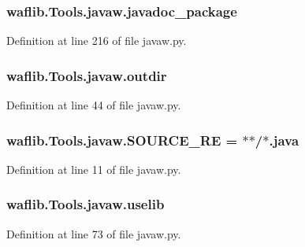 \subsubsection[{\texorpdfstring{javadoc\+\_\+package}{javadoc_package}}]{\setlength{\rightskip}{0pt plus 5cm}waflib.\+Tools.\+javaw.\+javadoc\+\_\+package}\hypertarget{namespacewaflib_1_1_tools_1_1javaw_a965e5565dd0a0d95f82c2b1ee2bcb520}{}\label{namespacewaflib_1_1_tools_1_1javaw_a965e5565dd0a0d95f82c2b1ee2bcb520}


Definition at line 216 of file javaw.\+py.

\subsubsection[{\texorpdfstring{outdir}{outdir}}]{\setlength{\rightskip}{0pt plus 5cm}waflib.\+Tools.\+javaw.\+outdir}\hypertarget{namespacewaflib_1_1_tools_1_1javaw_acdcd1f54bb01a7e871c5e849005c5736}{}\label{namespacewaflib_1_1_tools_1_1javaw_acdcd1f54bb01a7e871c5e849005c5736}


Definition at line 44 of file javaw.\+py.

\subsubsection[{\texorpdfstring{S\+O\+U\+R\+C\+E\+\_\+\+RE}{SOURCE_RE}}]{ waflib.\+Tools.\+javaw.\+S\+O\+U\+R\+C\+E\+\_\+\+RE = \textquotesingle{}$\ast$$\ast$/$\ast$.java\textquotesingle{}}\hypertarget{namespacewaflib_1_1_tools_1_1javaw_ace6d42bd8056b8a2b1a00ff9f2d89a38}{}\label{namespacewaflib_1_1_tools_1_1javaw_ace6d42bd8056b8a2b1a00ff9f2d89a38}


Definition at line 11 of file javaw.\+py.

\subsubsection[{\texorpdfstring{uselib}{uselib}}]{\setlength{\rightskip}{0pt plus 5cm}waflib.\+Tools.\+javaw.\+uselib}\hypertarget{namespacewaflib_1_1_tools_1_1javaw_a4148435040b59da62aa99500ab135bbc}{}\label{namespacewaflib_1_1_tools_1_1javaw_a4148435040b59da62aa99500ab135bbc}


Definition at line 73 of file javaw.\+py.

